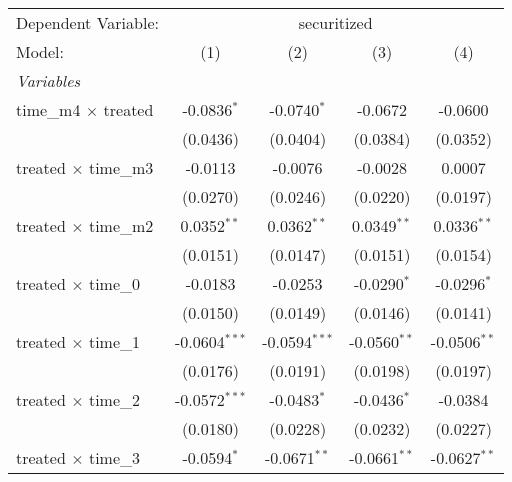 \begingroup
\centering
\begin{tabular}{lcccc}
   \tabularnewline \midrule \midrule
   Dependent Variable: & \multicolumn{4}{c}{securitized}\\
   Model:                                              & (1)             & (2)             & (3)             & (4)\\  
   \midrule
   \emph{Variables}\\
   time\_m4 $\times$ treated                           & -0.0836$^{*}$   & -0.0740$^{*}$   & -0.0672         & -0.0600\\   
                                                       & (0.0436)        & (0.0404)        & (0.0384)        & (0.0352)\\   
   treated $\times$ time\_m3                           & -0.0113         & -0.0076         & -0.0028         & 0.0007\\   
                                                       & (0.0270)        & (0.0246)        & (0.0220)        & (0.0197)\\   
   treated $\times$ time\_m2                           & 0.0352$^{**}$   & 0.0362$^{**}$   & 0.0349$^{**}$   & 0.0336$^{**}$\\   
                                                       & (0.0151)        & (0.0147)        & (0.0151)        & (0.0154)\\   
   treated $\times$ time\_0                            & -0.0183         & -0.0253         & -0.0290$^{*}$   & -0.0296$^{*}$\\   
                                                       & (0.0150)        & (0.0149)        & (0.0146)        & (0.0141)\\   
   treated $\times$ time\_1                            & -0.0604$^{***}$ & -0.0594$^{***}$ & -0.0560$^{**}$  & -0.0506$^{**}$\\   
                                                       & (0.0176)        & (0.0191)        & (0.0198)        & (0.0197)\\   
   treated $\times$ time\_2                            & -0.0572$^{***}$ & -0.0483$^{*}$   & -0.0436$^{*}$   & -0.0384\\   
                                                       & (0.0180)        & (0.0228)        & (0.0232)        & (0.0227)\\   
   treated $\times$ time\_3                            & -0.0594$^{*}$   & -0.0671$^{**}$  & -0.0661$^{**}$  & -0.0627$^{**}$\\   

\end{tabular}

